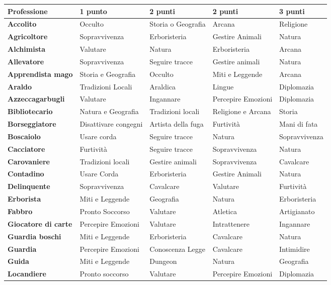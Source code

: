 \medskip

\noindent\begin{tabularx}{0.95\textwidth}{lllll}
\textbf{\textbf{Professione}}& \textbf{1 punto} & \textbf{2 punti} & \textbf{2 punti} & \textbf{3 punti}\\
\toprule
\textbf{Accolito}& Occulto& Storia o Geografia& Arcana& Religione\\
\textbf{Agricoltore}& Sopravvivenza &Erboristeria& Gestire Animali & Natura\\
\textbf{Alchimista}& Valutare&Natura& Erboristeria& Arcana\\
\textbf{Allevatore}& Sopravvivenza&Seguire tracce& Gestire animali&Natura \\
\textbf{Apprendista mago}& Storia e Geografia&Occulto&Miti e Leggende&Arcana\\
\textbf{Araldo} & Tradizioni Locali & Araldica & Lingue & Diplomazia \\
\textbf{Azzeccagarbugli}& Valutare&Ingannare&Percepire Emozioni&Diplomazia\\
\textbf{Bibliotecario}& Natura e Geografia&Tradizioni locali&Religione e Arcana&Storia\\
\textbf{Borseggiatore} & Disattivare congegni&Artista della fuga&Furtività&Mani di fata\\
\textbf{Boscaiolo}& Usare corda&Seguire tracce & Natura& Sopravvivenza\\
\textbf{Cacciatore}& Furtività&Seguire tracce&Sopravvivenza& Natura\\
\textbf{Carovaniere}&Tradizioni locali &Gestire animali&Sopravvivenza&Cavalcare\\
\textbf{Contadino} & Usare Corda & Erboristeria & Gestire Animali& Natura\\
\textbf{Delinquente}& Sopravvivenza&Cavalcare&Valutare&Furtività\\
\textbf{Erborista}& Miti e Leggende&Geografia&Natura&Erboristeria\\
\textbf{Fabbro} & Pronto Soccorso & Valutare&Atletica & Artigianato \\
\textbf{Giocatore di carte}& Percepire Emozioni&Valutare&Intrattenere&Ingannare\\
\textbf{Guardia boschi}& Miti e Leggende&Erboristeria&Cavalcare & Natura\\
\textbf{Guardia}& Percepire Emozioni&Conoscenza Legge&Cavalcare&Intimidire\\
\textbf{Guida}& Miti e Leggende&Dungeon&Natura&Geografia\\
\textbf{Locandiere}& Pronto soccorso&Valutare&Percepire Emozioni&Diplomazia\\

\end{tabularx}
